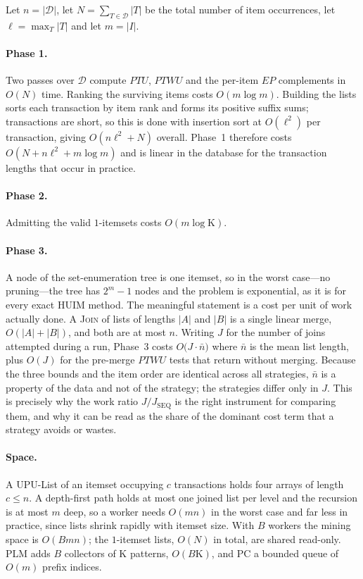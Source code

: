 \documentclass[pdflatex,sn-vancouver-num]{sn-jnl}
\theoremstyle{thmstyleone}%
\theoremstyle{thmstyletwo}%
\theoremstyle{thmstylethree}%
\newcommand{\DB}{\mathcal{D}}
\newcommand{\EP}{\mathit{EP}}
\newcommand{\PTU}{\mathit{PTU}}
\newcommand{\PTWU}{\mathit{PTWU}}
\newcommand{\Kk}{\mathrm{K}}
\begin{document}
Let $n=|\DB|$, let $N=\sum_{T\in\DB}|T|$ be the total number of
item occurrences, let $\ell=\max_T|T|$ and let $m=|I|$.
 
\paragraph{Phase 1.} Two passes over $\DB$ compute $\PTU$, $\PTWU$ and
the per-item $\EP$ complements in $O(N)$ time. Ranking the surviving
items costs $O(m\log m)$. Building the lists sorts each transaction by
item rank and forms its positive suffix sums; transactions are short, so
this is done with insertion sort at $O(\ell^{2})$ per transaction, giving
$O(n\ell^{2}+N)$ overall. Phase~1 therefore costs
$O(N+n\ell^{2}+m\log m)$ and is linear in the database for the
transaction lengths that occur in practice.
 
\paragraph{Phase 2.} Admitting the valid $1$-itemsets costs
$O(m\log \Kk)$.
 
\paragraph{Phase 3.} A node of the set-enumeration tree is one itemset,
so in the worst case---no pruning---the tree has $2^{m}-1$ nodes and the
problem is exponential, as it is for every exact HUIM method. The
meaningful statement is a cost per unit of work actually done. A
\textsc{Join} of lists of lengths $|A|$ and $|B|$ is a single linear
merge, $O(|A|+|B|)$, and both are at most $n$. Writing $J$ for the
number of joins attempted during a run, Phase~3 costs
$O\bigl(J\cdot\bar{n}\bigr)$ where $\bar{n}$ is the mean list length,
plus $O(J)$ for the pre-merge $\PTWU$ tests that return without merging.
Because the three bounds and the item order are identical across all
strategies, $\bar{n}$ is a property of the data and not of the strategy;
the strategies differ only in $J$. This is precisely why the work ratio
$J/J_{\text{SEQ}}$ is the right instrument for comparing them, and why
it can be read as the share of the dominant cost term that a strategy
avoids or wastes.
 
\paragraph{Space.} A UPU-List of an itemset occupying $c$ transactions
holds four arrays of length $c\le n$. A depth-first path holds at most
one joined list per level and the recursion is at most $m$ deep, so a
worker needs $O(mn)$ in the worst case and far less in practice, since
lists shrink rapidly with itemset size. With $B$ workers the mining
space is $O(Bmn)$; the $1$-itemset lists, $O(N)$ in total, are shared
read-only. PLM adds $B$ collectors of $\Kk$ patterns, $O(B\Kk)$, and PC a
bounded queue of $O(m)$ prefix indices.
 
\end{document}

